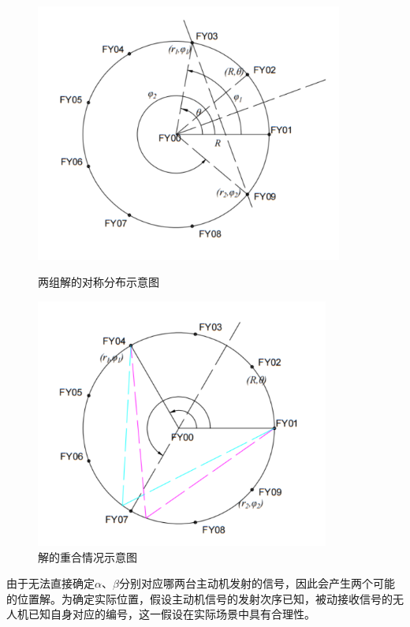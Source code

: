\documentclass[withoutpreface,bwprint]{cumcmthesis} %
\begin{document}
\begin{figure}[H]
    \centering
    \begin{minipage}{0.49\textwidth}
        \centering
        \includegraphics[width=0.9\textwidth]{../../figure/q1_3.png} 
        \caption{两组解的对称分布示意图}
        \label{q1_3}
    \end{minipage}
    \begin{minipage}{0.49\textwidth}
        \centering
        \includegraphics[width=0.86\textwidth]{../../figure/q1_4.png} 
        \caption{解的重合情况示意图}
        \label{q1_4}   
    \end{minipage}
\end{figure}


由于无法直接确定\(\alpha\)、\(\beta\)分别对应哪两台主动机发射的信号，因此会产生两个可能的位置解。为确定实际位置，假设主动机信号的发射次序已知，被动接收信号的无人机已知自身对应的编号，这一假设在实际场景中具有合理性。
\end{document}
